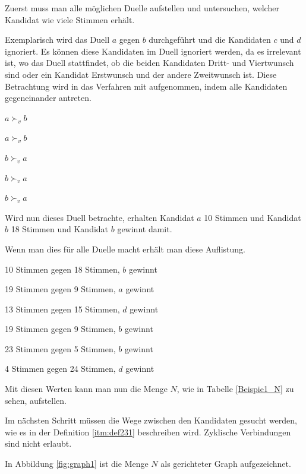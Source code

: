 Zuerst muss man alle möglichen Duelle aufstellen und untersuchen, welcher Kandidat wie viele Stimmen erhält.

Exemplarisch wird das Duell $a$ gegen $b$ durchgeführt und die Kandidaten $c$ und $d$ ignoriert. Es können diese Kandidaten im Duell ignoriert werden, da es irrelevant ist, wo das Duell stattfindet, ob die beiden Kandidaten Dritt- und Viertwunsch sind oder ein Kandidat Erstwunsch und der andere Zweitwunsch ist. Diese Betrachtung wird in das Verfahren mit aufgenommen, indem alle Kandidaten gegeneinander antreten.

\begin{description}
\centering
\item[6 mal] $a \succ_{v} b$
\item[4 mal] $a \succ_{v} b$
\item[10 mal] $b \succ_{v} a$
\item[3 mal] $b \succ_{v} a$
\item[5 mal] $b \succ_{v}a$
\end{description}

Wird nun dieses Duell betrachte, erhalten Kandidat $a$ 10 Stimmen und Kandidat $b$ 18 Stimmen und Kandidat $b$ gewinnt damit.


Wenn man dies für alle Duelle macht erhält man diese Auflistung.
 \begin{description}
 \centering
 \item[$a$ vs. $b$] 10 Stimmen gegen 18 Stimmen, $b$ gewinnt
 \item[$a$ vs. $c$] 19 Stimmen gegen 9 Stimmen, $a$ gewinnt
 \item[$a$ vs. $d$] 13 Stimmen gegen 15 Stimmen, $d$ gewinnt
 \item[$b$ vs. $c$] 19 Stimmen gegen 9 Stimmen, $b$ gewinnt
 \item[$b$ vs. $d$] 23 Stimmen gegen 5 Stimmen, $b$ gewinnt
 \item[$c$ vs. $d$] 4 Stimmen gegen 24 Stimmen, $d$ gewinnt
 \end{description}
 
 Mit diesen Werten kann man nun die Menge $N$, wie in Tabelle \ref{Beispie1_N} zu sehen, aufstellen.



Im nächsten Schritt müssen die Wege zwischen den Kandidaten gesucht werden, wie es in der Definition \ref{itm:def231} beschreiben wird. Zyklische Verbindungen sind nicht erlaubt.

In Abbildung \ref{fig:graph1} ist die Menge $N$ als gerichteter Graph aufgezeichnet.

